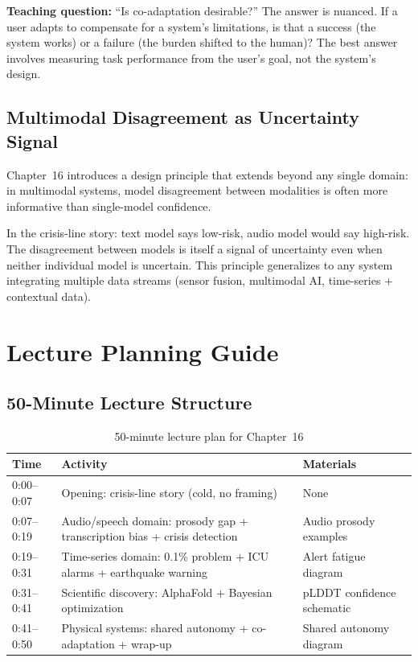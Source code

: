 \textbf{Teaching question:} ``Is co-adaptation desirable?'' The answer is nuanced. If a user adapts to compensate for a system's limitations, is that a success (the system works) or a failure (the burden shifted to the human)? The best answer involves measuring task performance from the user's goal, not the system's design.

\subsection{Multimodal Disagreement as Uncertainty Signal}

Chapter~16 introduces a design principle that extends beyond any single domain: in multimodal systems, model disagreement between modalities is often more informative than single-model confidence.

In the crisis-line story: text model says low-risk, audio model would say high-risk. The disagreement between models is itself a signal of uncertainty even when neither individual model is uncertain. This principle generalizes to any system integrating multiple data streams (sensor fusion, multimodal AI, time-series + contextual data).

\section{Lecture Planning Guide}

\subsection{50-Minute Lecture Structure}

\begin{table}[htbp]
\caption{50-minute lecture plan for Chapter~16}
\label{tab:lecture-plan-ch16}
\centering
\begin{tabular}{@{}p{2.5cm}p{6cm}p{3.5cm}@{}}
\toprule
\textbf{Time} & \textbf{Activity} & \textbf{Materials} \\
\midrule
0:00--0:07 & Opening: crisis-line story (cold, no framing) & None \\
0:07--0:19 & Audio/speech domain: prosody gap + transcription bias + crisis detection & Audio prosody examples \\
0:19--0:31 & Time-series domain: 0.1\% problem + ICU alarms + earthquake warning & Alert fatigue diagram \\
0:31--0:41 & Scientific discovery: AlphaFold + Bayesian optimization & pLDDT confidence schematic \\
0:41--0:50 & Physical systems: shared autonomy + co-adaptation + wrap-up & Shared autonomy diagram \\
\bottomrule
\end{tabular}
\end{table}


